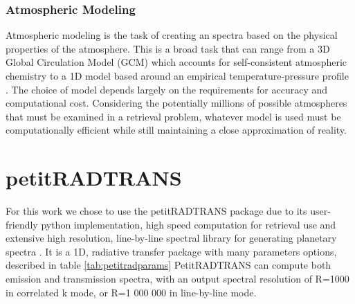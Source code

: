 \subsubsection{Atmospheric Modeling}
Atmospheric modeling is the task of creating an spectra based on the physical properties of the atmosphere.
This is a broad task that can range from a 3D Global Circulation Model (GCM) which accounts for self-consistent atmospheric chemistry \parencite{Chen2019} to a 1D model based around an empirical temperature-pressure profile \parencite{Molliere2019}.
The choice of model depends largely on the requirements for accuracy and computational cost. 
Considering the potentially millions of possible atmospheres that must be examined in a retrieval problem, whatever model is used must be computationally efficient while still maintaining a close approximation of reality.

\section{petitRADTRANS}
For this work we chose to use the petitRADTRANS package due to its user-friendly python implementation, high speed computation for retrieval use and extensive high resolution, line-by-line spectral library for generating planetary spectra \parencite{Molliere2019}. 
It is a 1D, radiative transfer package with many parameters options, described in table \ref{tab:petitradparams}
PetitRADTRANS can compute both emission and transmission spectra, with an output spectral resolution of R=1000 in correlated k mode, or R=1 000 000 in line-by-line mode. 

